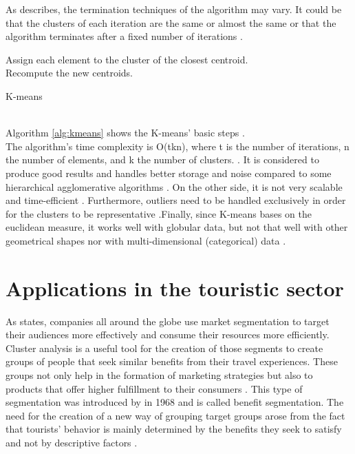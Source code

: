 As \textcite{dunham} describes, the termination techniques of the algorithm may vary. It could be that the clusters of each iteration are the same or almost the same or that the algorithm terminates after a fixed number of iterations \autocite[140]{dunham}.
\begin{algorithm}
\SetAlgoLined
{}
{
Assign each element to the cluster of the closest centroid.\\
Recompute the new centroids.
}
\caption{K-means}\label{alg:kmeans}
\end{algorithm} \\
Algorithm \ref{alg:kmeans} shows the K-means' basic steps \autocite{dunham, tanSteinKum}. \\
The algorithm's time complexity is O(tkn), where t is the number of iterations, n the number of elements, and k the number of clusters. \autocite[141]{dunham}. It is considered to produce good results and handles better storage and noise compared to some hierarchical agglomerative algorithms \autocite[526]{tanSteinKum}. On the other side, it is not very scalable and time-efficient \autocite[141]{dunham}. Furthermore, outliers need to be handled exclusively in order for the clusters to be representative \autocite[506]{tanSteinKum}.Finally, since K-means bases on the euclidean measure, it works well with globular data, but not that well with other geometrical shapes nor with multi-dimensional (categorical) data \autocite[647, 649]{survey}.
\section{Applications in the touristic sector}
\label{applications}
As \textcite{data-drivenSegmentation} states, companies all around the globe use market segmentation to target their audiences more effectively and consume their resources more efficiently. Cluster analysis is a useful tool for the creation of those segments to create groups of people that seek similar benefits from their travel experiences. These groups not only help in the formation of marketing strategies but also to products that offer higher fulfillment to their consumers \autocite[17]{data-drivenSegmentation}. This type of segmentation was introduced by \textcite{Haley} in 1968 and is called benefit segmentation. The need for the creation of a new way of grouping target groups arose from the fact that tourists' behavior is mainly determined by the benefits they seek to satisfy and not by descriptive factors \autocite[31]{Haley}. \\
